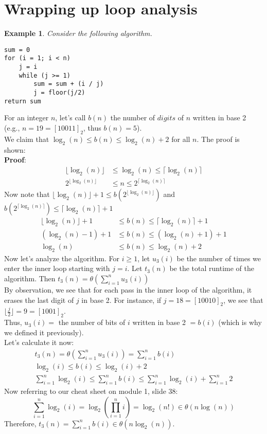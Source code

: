 \documentclass{report}
\newtheorem{ex}{Example}[section]
\begin{document}
\section{Wrapping up loop analysis}
\begin{ex}
Consider the following algorithm.
\end{ex}
\begin{lstlisting}
sum = 0
for (i = 1; i < n)
	j = i
	while (j >= 1)
		sum = sum + (i / j)
		j = floor(j/2)
return sum
\end{lstlisting}
For an integer $n$, let's call $b(n)$ the number of $digits$ of $n$ written in base 2 (e.g., $n=19=[10011]_2$, thus $b(n) = 5$).\\
We claim that $\log_2 (n) \leq b(n) \leq \log_2(n) + 2$ for all $n$. The proof is shown:\\
\textbf{Proof}:
\begin{align}
\lfloor \log_2 (n)\rfloor &\leq \log_2(n) \leq \lceil \log_2 (n)\rceil \\
2^{\lfloor \log_2 (n)\rfloor} &\leq n \leq 2^{\lceil \log_2 (n)\rceil}
\end{align}
Now note that $\lfloor \log_2 (n)\rfloor + 1 \leq b(2^{\lfloor \log_2 (n)\rfloor})$ and $b(2^{\lceil \log_2 (n)\rceil}) \leq \lceil \log_2 (n)\rceil + 1$
\begin{align}
\lfloor \log_2 (n)\rfloor + 1 &\leq b(n) \leq \lceil \log_2 (n)\rceil + 1 \\
(\log_2 (n) - 1) + 1 &\leq b(n) \leq  (\log_2 (n) + 1) + 1 \\
\log_2 (n) &\leq b(n) \leq  \log_2 (n) + 2
\end{align}
Now let's analyze the algorithm. For $i \geq 1$, let $u_3(i)$ be the number of times we enter the inner loop starting with $j=i$. Let $t_3(n)$ be the total runtime of the algorithm. Then $t_3(n) = \displaystyle \theta\left(\sum_{i=1}^n u_3(i)\right)$\\
By observation, we see that for each pass in the inner loop of the algorithm, it erases the last digit of $j$ in base 2. For instance, if $j=18=[10010]_2$, we see that $\lfloor \frac{j}{2} \rfloor = 9 = [1001]_2$.\\
Thus, $u_3(i) =$ the number of bits of $i$ written in base 2 $= b(i)$ (which is why we defined it previously).\\
Let's calculate it now:
\begin{align}
t_3(n) = \theta\left(\sum_{i=1}^n u_3(i)\right) = \sum_{i=1}^n b(i)\\
\log_2 (i) \leq b(i) \leq  \log_2 (i) + 2\\
\sum_{i=1}^n \log_2(i) \leq \sum_{i=1}^n b(i) \leq \sum_{i=1}^n \log_2(i) + \sum_{i=1}^n 2
\end{align}
Now referring to our cheat sheet on module 1, slide 38:
$$\sum_{i=1}^n \log_2(i) = \log_2\left(\prod_{i=1}^n i\right) = \log_2 (n!) \in \theta(n \log (n))$$
Therefore, $t_3(n) = \displaystyle\sum_{i=1}^n b(i) \in \theta(n \log_2(n))$.
\end{document}
